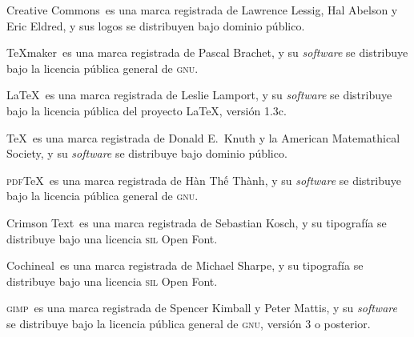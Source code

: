 \documentclass[14pt,twoside,final]{extbook} %
\begin{document}
\noindent Creative Commons\texttrademark\ es una marca registrada de Lawrence Lessig, Hal Abelson y Eric Eldred, y sus logos se distribuyen bajo dominio público.

\TeX{}maker\texttrademark\ es una marca registrada de Pascal Brachet, y su \emph{software} se distribuye bajo la licencia pública general de \textsc{gnu}.

\LaTeX{}\texttrademark\ es una marca registrada de Leslie Lamport, y su \emph{software} se distribuye bajo la licencia pública del proyecto \LaTeX{}, versión 1.3c.

\TeX{}\texttrademark\ es una marca registrada de Donald E.~Knuth y la American Matemathical Society, y su \emph{software} se distribuye bajo dominio público.

\textsc{pdf}\TeX{}\texttrademark\ es una marca registrada de Hàn Th\'{ê} Thành, y su \emph{software} se distribuye bajo la licencia pública general de \textsc{gnu}.

Crimson Text\texttrademark\ es una marca registrada de Sebastian Kosch, y su tipografía se distribuye bajo una licencia \textsc{sil} Open Font.

Cochineal\texttrademark\ es una marca registrada de Michael Sharpe, y su tipografía se distribuye bajo una licencia \textsc{sil} Open Font.

\textsc{gimp}\texttrademark\ es una marca registrada de Spencer Kimball y Peter Mattis, y su \emph{software} se distribuye bajo la licencia pública general de \textsc{gnu}, versión 3 o posterior.
\end{document}
